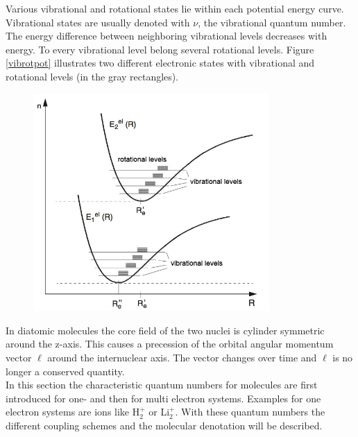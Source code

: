 \documentclass[parskip,12pt,headsepline,a4paper] {scrbook}
\begin{document}
Various vibrational and rotational states lie within each potential energy curve. Vibrational states are usually denoted with $\nu$, the vibrational quantum number. The energy difference between neighboring vibrational levels decreases with energy. To every vibrational level belong several rotational levels. Figure \ref{vibrotpot} illustrates two different electronic states with vibrational and rotational levels (in the gray rectangles).

\begin{figure}[ht]
\centerline{
\includegraphics[width=9cm]{./spectroscopy/vib-rot-pot.jpg}}
\end{figure}



In diatomic molecules the core field of the two nuclei is cylinder symmetric around the z-axis. This causes a precession of the orbital angular momentum vector $\boldsymbol{\ell}$ around the internuclear axis. The vector changes over time and $\boldsymbol{\ell}$ is no longer a conserved quantity. \\
In this section the characteristic quantum numbers for molecules are first introduced for one- and then for multi electron systems. Examples for one electron systems are ions like H$^+_2$ or Li$^+_2$. With these quantum numbers the different coupling schemes and the molecular denotation will be described.
\end{document}
